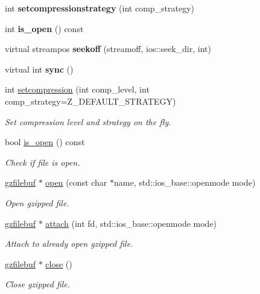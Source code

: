 \begin{DoxyCompactItemize}
int {\bfseries setcompressionstrategy} (int comp\+\_\+strategy)
\item 
\mbox{\label{classgzfilebuf_af2619b96e3ddea9050be70dd21de4752}} 
int {\bfseries is\+\_\+open} () const
\item 
\mbox{\label{classgzfilebuf_a203873c0b0c7710193434c88ae2c6ff2}} 
virtual streampos {\bfseries seekoff} (streamoff, ios\+::seek\+\_\+dir, int)
\item 
\mbox{\label{classgzfilebuf_a8fdf6b079487c0034cb920c63c9eaf55}} 
virtual int {\bfseries sync} ()
\item 
int \hyperlink{classgzfilebuf_ad109ea4fc4ca7cc19d8014b53375255d}{setcompression} (int comp\+\_\+level, int comp\+\_\+strategy=Z\+\_\+\+D\+E\+F\+A\+U\+L\+T\+\_\+\+S\+T\+R\+A\+T\+E\+GY)
\begin{DoxyCompactList}\small\item\em Set compression level and strategy on the fly. \end{DoxyCompactList}\item 
bool \hyperlink{classgzfilebuf_a24dfb3e35c147aaf3a562c1ea4268757}{is\+\_\+open} () const
\begin{DoxyCompactList}\small\item\em Check if file is open. \end{DoxyCompactList}\item 
\hyperlink{classgzfilebuf}{gzfilebuf} $\ast$ \hyperlink{classgzfilebuf_a78281ba60675bf8727e92ed23b4a2cc9}{open} (const char $\ast$name, std\+::ios\+\_\+base\+::openmode mode)
\begin{DoxyCompactList}\small\item\em Open gzipped file. \end{DoxyCompactList}\item 
\hyperlink{classgzfilebuf}{gzfilebuf} $\ast$ \hyperlink{classgzfilebuf_a72889233c00bfd297ca01723cc4ed8fc}{attach} (int fd, std\+::ios\+\_\+base\+::openmode mode)
\begin{DoxyCompactList}\small\item\em Attach to already open gzipped file. \end{DoxyCompactList}\item 
\hyperlink{classgzfilebuf}{gzfilebuf} $\ast$ \hyperlink{classgzfilebuf_a280d1c661fb371c22de1214d5a1682a2}{close} ()
\begin{DoxyCompactList}\small\item\em Close gzipped file. \end{DoxyCompactList}\end{DoxyCompactItemize}
